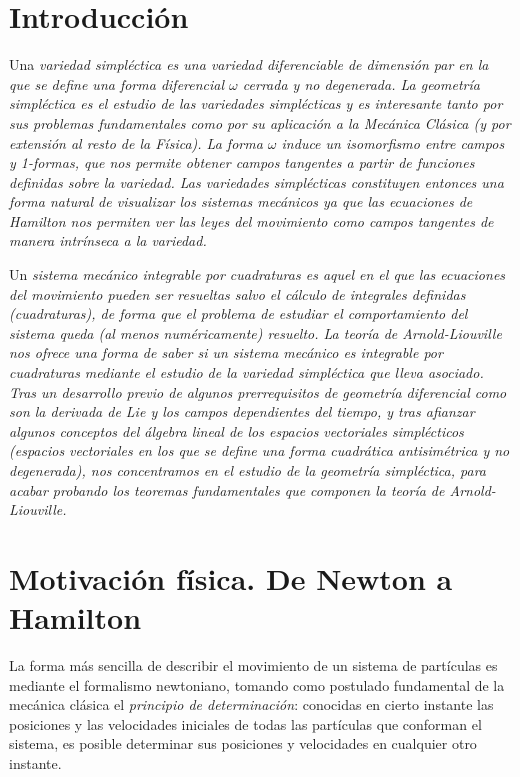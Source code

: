 \section*{Introducción}
Una \em variedad simpléctica \em es una variedad diferenciable de dimensión par en la que se define una forma diferencial $\omega$ cerrada y no degenerada. La \em geometría simpléctica \em es el estudio de las variedades simplécticas y es interesante tanto por sus problemas fundamentales como por su aplicación a la Mecánica Clásica (y por extensión al resto de la Física). La forma $\omega$ induce un isomorfismo entre campos y 1-formas, que nos permite obtener campos tangentes a partir de funciones definidas sobre la variedad. Las variedades simplécticas constituyen entonces una forma natural de visualizar los sistemas mecánicos ya que las \em ecuaciones de Hamilton \em nos permiten ver las leyes del movimiento como campos tangentes de manera intrínseca a la variedad. 

Un \em sistema mecánico integrable por cuadraturas \em  es aquel en el que las ecuaciones del movimiento pueden ser resueltas salvo el cálculo de integrales definidas (cuadraturas), de forma que el problema de estudiar el comportamiento del sistema queda (al menos numéricamente) resuelto. La \em teoría de Arnold-Liouville \em nos ofrece una forma de saber si un sistema mecánico es integrable por cuadraturas mediante el estudio de la variedad simpléctica que lleva asociado.
Tras un desarrollo previo de algunos prerrequisitos de geometría diferencial como son la \em derivada de Lie \em y los \em campos dependientes del tiempo\em, y tras afianzar algunos conceptos del álgebra lineal de los \em espacios vectoriales simplécticos \em (espacios vectoriales en los que se define una forma cuadrática antisimétrica y no degenerada), nos concentramos en el estudio de la geometría simpléctica, para acabar probando los teoremas fundamentales que componen la teoría de Arnold-Liouville.



\section{Motivación física. De Newton a Hamilton} \label{sec:fisica}
La forma más sencilla de describir el movimiento de un sistema de partículas es mediante el formalismo newtoniano, tomando como postulado fundamental de la mecánica clásica el \emph{principio de determinación}: conocidas en cierto instante las posiciones y las velocidades iniciales de todas las partículas que conforman el sistema, es posible determinar sus posiciones y velocidades en cualquier otro instante.

